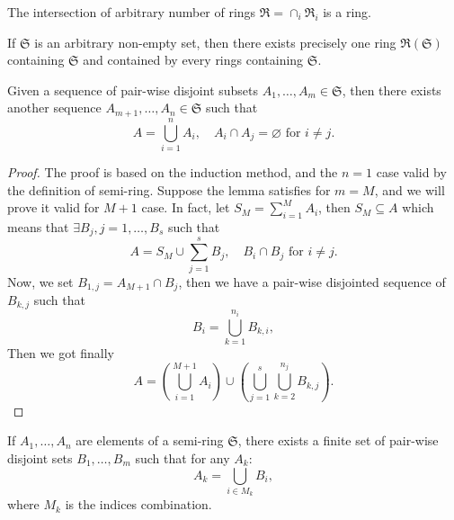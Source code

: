 \begin{theorem}
The intersection of arbitrary number of rings $\mathfrak{R}=\cap_i\mathfrak{R}_i$ is a ring.
\end{theorem}

\begin{theorem}
If $\mathfrak{S}$ is an arbitrary non-empty set, then there exists precisely one ring $\mathfrak{R}(\mathfrak{S})$ containing $\mathfrak{S}$ and contained by every rings containing $\mathfrak{S}$.
\end{theorem}

\begin{lemma}\label{lemma:semi-ring_1}
Given a sequence of pair-wise disjoint subsets $A_1,\dots,A_m\in\mathfrak{S}$, then there exists another sequence $A_{m+1},\dots,A_n\in\mathfrak{S}$ such that
\begin{equation}
A=\bigcup_{i=1}^nA_i,\quad A_i\cap A_j=\varnothing\text{ for }i\ne j. 
\end{equation}
\end{lemma}

\begin{proof}
The proof is based on the induction method, and the $n=1$ case valid by the definition of semi-ring. Suppose the lemma satisfies for $m=M$, and we will prove it valid for $M+1$ case. In fact, let $S_{M}=\sum_{i=1}^MA_i$, then $S_M\subseteq A$ which means that $\exists B_j,j=1,\dots,B_s$ such that
\begin{equation}
A=S_M\cup\sum_{j=1}^sB_j,\quad B_i\cap B_j\text{ for }i\ne j.
\end{equation}
Now, we set $B_{1,j}=A_{M+1}\cap B_j$, then we have a pair-wise disjointed sequence of $B_{k,j}$ such that
\begin{equation}
B_i=\bigcup_{k=1}^{n_i}B_{k,i},
\end{equation}
Then we got finally
\begin{equation}
A=\left(\bigcup_{i=1}^{M+1}A_i\right)\cup\left(\bigcup_{j=1}^s\bigcup_{k=2}^{n_j}B_{k,j}\right).
\end{equation}
\end{proof}

\begin{lemma}\label{lemma:semi-ring_2}
If $A_1,\dots,A_n$ are elements of a semi-ring $\mathfrak{S}$, there exists a finite set of pair-wise disjoint sets $B_1,\dots,B_m$ such that for any $A_k$:
\begin{equation}
A_k=\bigcup_{i\in M_k}B_i,
\end{equation}
where $M_k$ is the indices combination.
\end{lemma}

